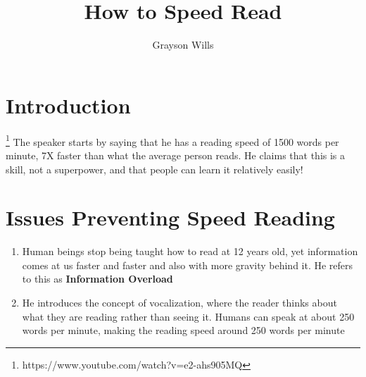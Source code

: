 \documentclass{article}
\title{How to Speed Read}
\author{Grayson Wills}
\begin{document}
\maketitle


\section*{Introduction}
    \footnote{https://www.youtube.com/watch?v=e2-ahs905MQ}
    The speaker starts by saying that he has a reading speed of 1500 words per minute, 7X faster than what the average person reads. He claims that this is a skill, not a superpower, and that people can learn it relatively easily!
    
\section*{Issues Preventing Speed Reading}
    \begin{enumerate}
    \item Human beings stop being taught how to read at 12 years old, yet information comes at us faster and faster and also with more gravity behind it. He refers to this as \textbf{Information Overload}

    \item He introduces the concept of vocalization, where the reader thinks about what they are reading rather than seeing it. Humans can speak at about 250 words per minute, making the reading speed around 250 words per minute

    \end{enumerate}
\end{document}
